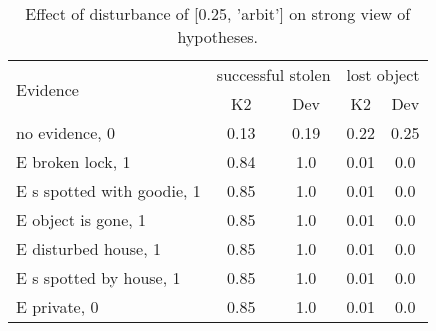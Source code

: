 \begin{table}\begin{tabular}{l|cc|cc}\toprule\multirow{2}{*}{Evidence} & \multicolumn{2}{c}{successful stolen}& \multicolumn{2}{c}{lost object}\\& {K2} & {Dev}& {K2} & {Dev}\\\midrule
no evidence, 0 & \cellcolor{Bittersweet}0.13&\cellcolor{Bittersweet}0.19&0.22&0.25\\E broken lock, 1 & \cellcolor{Bittersweet}0.84&\cellcolor{Bittersweet}1.0&0.01&0.0\\E s spotted with goodie, 1 & \cellcolor{Bittersweet}0.85&\cellcolor{Bittersweet}1.0&0.01&0.0\\E object is gone, 1 & \cellcolor{Bittersweet}0.85&\cellcolor{Bittersweet}1.0&0.01&0.0\\E disturbed house, 1 & \cellcolor{Bittersweet}0.85&\cellcolor{Bittersweet}1.0&0.01&0.0\\E s spotted by house, 1 & \cellcolor{Bittersweet}0.85&\cellcolor{Bittersweet}1.0&0.01&0.0\\E private, 0 & \cellcolor{Bittersweet}0.85&\cellcolor{Bittersweet}1.0&0.01&0.0\\\bottomrule\end{tabular}\caption{Effect of disturbance of [0.25, 'arbit'] on strong view of hypotheses.}\end{table}